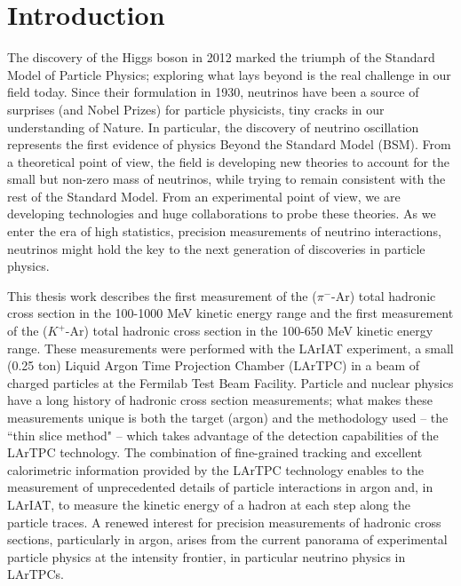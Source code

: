 \chapter{Introduction}\label{ch:-1}
The discovery of the Higgs boson in 2012 marked the triumph of the Standard Model of Particle Physics; exploring what lays beyond is the real challenge in our field today. 
Since their formulation in 1930, neutrinos have been a source of surprises (and Nobel Prizes) for particle physicists, tiny cracks in our understanding of Nature. In particular, the discovery of neutrino oscillation represents the first evidence of physics Beyond the Standard Model (BSM).  From a theoretical point of view, the field is developing new theories to account for the small but non-zero mass of neutrinos, while trying to remain consistent with the rest of the Standard Model.  From an experimental point of view, we are developing technologies and huge collaborations to probe these theories. As we enter the era of high statistics, precision measurements of neutrino interactions, neutrinos might hold the key to the next generation of discoveries in particle physics.


This thesis work describes the first measurement of the  ($\pi^-$-Ar)  total hadronic cross section  in the 100-1000 MeV  kinetic energy range and the first measurement of the ($K^+$-Ar) total hadronic cross section  in the 100-650 MeV  kinetic energy range. These measurements were performed with the LArIAT experiment,  a small (0.25 ton)  Liquid Argon Time Projection Chamber (LArTPC) in a beam of charged particles at the Fermilab Test Beam Facility.   Particle and nuclear physics have a long history of hadronic cross section measurements; what makes these measurements unique is both the target (argon) and the methodology used -- the ``thin slice method" -- which takes advantage of the detection capabilities of the LArTPC technology. The combination of fine-grained tracking and excellent calorimetric information provided by the LArTPC technology  enables to the measurement of unprecedented details of particle interactions in argon and, in LArIAT, to measure the kinetic energy of a hadron at each step along the particle traces. A renewed interest for precision measurements of hadronic cross sections, particularly in argon, arises from the current  panorama of experimental  particle physics at the intensity frontier, in particular neutrino physics in LArTPCs.


